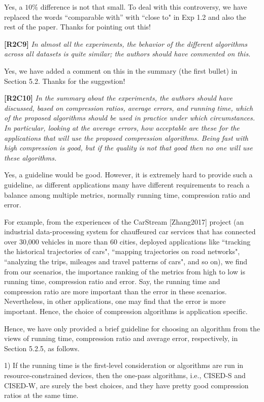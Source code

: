 \documentclass{letter}
\begin{document}
Yes, a $10\%$ difference is not that small. To deal with this controversy, we have replaced the words ``comparable with'' with ``close to" in Exp 1.2 and also the rest of the paper. Thanks for pointing out this!


\textbf{[R2C9]} \emph{In almost all the experiments, the behavior of the different algorithms across all datasets is quite similar; the authors should have commented on this.}

Yes, we have added a comment on this in the summary (the first bullet) in Section 5.2. Thanks for the suggestion!


\textbf{[R2C10]} \emph{In the summary about the experiments, the authors should have discussed, based on compression ratios, average errors, and running time, which of the proposed algorithms should be used in practice under which circumstances. In particular, looking at the average errors, how acceptable are these for the applications that will use the proposed compression algorithms. Being fast with high compression is good, but if the quality is not that good then no one will use these algorithms.}

Yes, a guideline would be good. However, it is extremely hard to provide such a  guideline, as different applications many have different requirements to reach a balance among multiple metrics, normally running time, compression ratio and  error.

For example, from the experiences of the CarStream [Zhang2017] project (an industrial data-processing system for chauffeured car services that has connected over 30,000 vehicles in more than 60 cities, deployed applications like ``tracking the historical trajectories of cars", ``mapping trajectories on road networks", ``analyzing the trips, mileages and travel patterns of cars", and so on), we find from our scenarios,  the importance ranking of the metrics from high to low is running time, compression ratio and error. Say, the running time and compression ratio are more important than the error in these scenarios.
Nevertheless, in other applications, one may find that the error is more important.
Hence, the choice of compression algorithms is application specific.

Hence, we have only provided a brief guideline for choosing an algorithm from the views of running time, compression ratio and average error, respectively, in Section 5.2.5, as follows.

1) If the running time is the first-level consideration
or algorithms are run in resource-constrained devices,
then the one-pass algorithms, i.e., CISED-S and CISED-W, are surely the best choices, and they have pretty
good compression ratios at the same time. %
\end{document}
